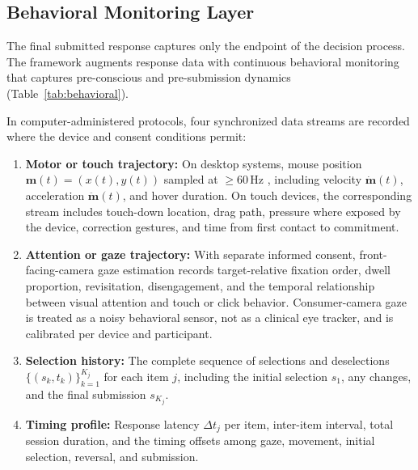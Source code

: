 \documentclass[11pt,letterpaper]{article}
\begin{document}
\subsection{Behavioral Monitoring Layer}
\label{sec:behavioral}

The final submitted response captures only the endpoint of the decision process. The framework augments response data with continuous behavioral monitoring that captures pre-conscious and pre-submission dynamics (Table~\ref{tab:behavioral}).

In computer-administered protocols, four synchronized data streams are recorded where the device and consent conditions permit:

\begin{enumerate}[nosep]
    \item \textbf{Motor or touch trajectory:} On desktop systems, mouse position $\mathbf{m}(t) = (x(t), y(t))$ sampled at $\geq 60$\,Hz \cite{freeman2011}, including velocity $\dot{\mathbf{m}}(t)$, acceleration $\ddot{\mathbf{m}}(t)$, and hover duration. On touch devices, the corresponding stream includes touch-down location, drag path, pressure where exposed by the device, correction gestures, and time from first contact to commitment.
    \item \textbf{Attention or gaze trajectory:} With separate informed consent, front-facing-camera gaze estimation records target-relative fixation order, dwell proportion, revisitation, disengagement, and the temporal relationship between visual attention and touch or click behavior. Consumer-camera gaze is treated as a noisy behavioral sensor, not as a clinical eye tracker, and is calibrated per device and participant.
    \item \textbf{Selection history:} The complete sequence of selections and deselections $\{(s_k, t_k)\}_{k=1}^{K_j}$ for each item $j$, including the initial selection $s_1$, any changes, and the final submission $s_{K_j}$.
    \item \textbf{Timing profile:} Response latency $\Delta t_j$ per item, inter-item interval, total session duration, and the timing offsets among gaze, movement, initial selection, reversal, and submission.
\end{enumerate}
\end{document}
